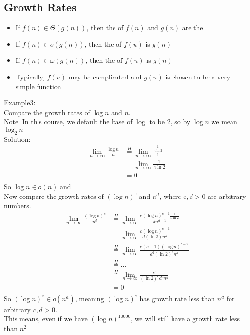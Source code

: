 \documentclass[letterpaper, 12pt]{article}
\newcommand{\red}[1]{{\color{red}{#1}}}
\begin{document}
    \subsection{Growth Rates}
    \begin{itemize}
        \item If $f(n) \in \Theta(g(n))$, then the \red{growth rates} of $f(n)$ and $g(n)$ are the \red{same}
        \item If $f(n) \in o(g(n))$, then the \red{growth rates} of $f(n)$ is \red{less than} $g(n)$
        \item If $f(n) \in \omega(g(n))$, then the \red{growth rates} of $f(n)$ is \red{greater than} $g(n)$
        \item Typically, $f(n)$ may be complicated and $g(n)$ is chosen to be a very simple function
    \end{itemize}
    \bigskip

    Example3:\\
    Compare the growth rates of $\log n$ and $n$.\\
    Note: In this course, we default the base of $\log$ to be 2, so by $\log n$ we mean $\log_{2}n$\\
    \bigskip
    Solution:\\
    \begin{align*}
        \lim_{n \rightarrow \infty} \frac{\log n}{n} &\overset{H}{=} \lim_{n \rightarrow \infty}\frac{\frac{1}{n\ln 2}}{1}\\
        &= \lim_{n \rightarrow \infty}\frac{1}{n\ln 2}\\
        &= 0\\
    \end{align*}
    So $\log n \in o(n)$ and \\
    \bigskip
    Now compare the growth rates of $(\log n)^c$ and $n^d$, where $c, d > 0$ are arbitrary numbers.\\
    \begin{align*}
        \lim_{n \rightarrow \infty} \frac{(\log n)^c}{n^d} &\overset{H}{=} \lim_{n \rightarrow \infty} \frac{c(\log n)^{c-1}\frac{1}{n\ln 2}}{dn^{d-1}}\\
        &= \lim_{n \rightarrow \infty} \frac{c(\log n)^{c-1}}{d(\ln 2)n^d}\\
        &\overset{H}{=} \lim_{n \rightarrow \infty} \frac{c(c-1)(\log n)^{c-2}}{d^2(\ln 2)^2n^d}\\
        &\overset{H}{=}\dots\\
        &\overset{H}{=} \lim_{n \rightarrow \infty} \frac{c!}{(\ln 2)^cd^cn^d}\\
        &= 0\\
    \end{align*}
    So $(\log n)^c \in o(n^d)$, meaning $(\log n)^c$ has growth rate less than $n^d$ for arbitrary $c,d > 0$.\\
    This means, even if we have $(\log n)^10000$, we will still have a growth rate less than $n^2$\\
    \pagebreak
\end{document}

